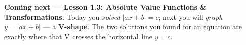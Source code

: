 \vspace{0.10in}

\boxguard[10]
\begin{spiralbox}
\small
\textbf{Coming next --- Lesson 1.3: Absolute Value Functions \& Transformations.} Today you
\emph{solved} $|ax+b| = c$; next you will \emph{graph} $y = |ax+b|$ --- a \textbf{V-shape}. The two
solutions you found for an equation are exactly where that V crosses the horizontal line $y = c$.
\end{spiralbox}


